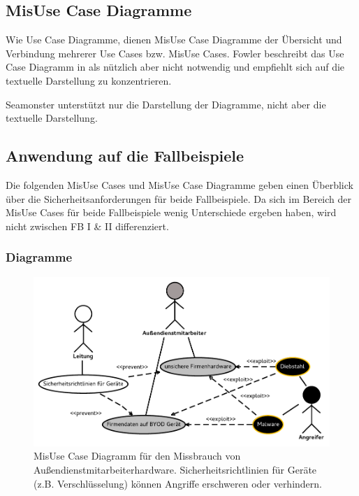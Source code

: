 \subsection{MisUse Case Diagramme}
Wie Use Case Diagramme, dienen MisUse Case Diagramme der Übersicht und Verbindung mehrerer Use Cases bzw. MisUse Cases. Fowler beschreibt das Use Case Diagramm in \cite{fowler2004uml} als nützlich aber nicht notwendig und empfiehlt sich auf die textuelle Darstellung zu konzentrieren. 

Seamonster unterstützt nur die Darstellung der Diagramme, nicht aber die textuelle Darstellung.

\subsection{Anwendung auf die Fallbeispiele}
Die folgenden MisUse Cases und MisUse Case Diagramme geben einen Überblick über die Sicherheitsanforderungen für beide Fallbeispiele. Da sich im Bereich der MisUse Cases für beide Fallbeispiele wenig Unterschiede ergeben haben, wird nicht zwischen FB I \& II differenziert.

\subsubsection{Diagramme}

\begin{figure}[h]
\includegraphics[scale=0.8]{images/Hardware.pdf} 
\caption{MisUse Case Diagramm für den Missbrauch von Außendienstmitarbeiterhardware. Sicherheitsrichtlinien für Geräte (z.B. Verschlüsselung) können Angriffe erschweren oder verhindern.}
\end{figure}

